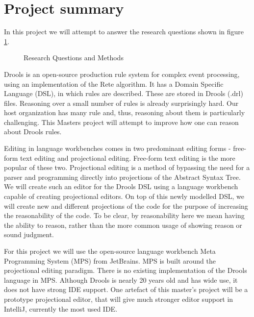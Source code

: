 \section{Project summary}

In this project we will attempt to answer the research questions shown in figure \ref{fig:Research_Questions}.
\begin{figure}[H]
    \centering
    \caption{Research Questions and Methods}
    \label{fig:Research_Questions}
\end{figure}


Drools\cite{browne2009jboss} is an open-source production rule system for complex event processing, using an implementation of the Rete algorithm\cite{forgy1989rete}.
It has a Domain Specific Language (DSL), in which rules are described.
These are stored in Drools (.drl) files. 
Reasoning over a small number of rules is already surprisingly hard.
Our host organization has many rule and, thus, reasoning about them is particularly challenging.
This Masters project will attempt to improve how one can reason about Drools rules.

Editing in language workbenches comes in two predominant editing forms - free-form text editing and projectional editing\cite{erdweg2013state}.
Free-form text editing is the more popular of these two.
Projectional editing is a method of bypassing the need for a parser and programming directly into projections of the Abstract Syntax Tree.
We will create such an editor for the Drools DSL using a language workbench capable of creating projectional editors.  
On top of this newly modelled DSL, we will create new and different projections of the code for the purpose of increasing the reasonability of the code. 
To be clear, by reasonability here we mean having the ability to reason, rather than the more common usage of showing reason or sound judgment.

For this project we will use the open-source language workbench Meta Programming System (MPS) from JetBrains\cite{MPS_ProductPage}.
MPS is built around the projectional editing paradigm.
There is no existing implementation of the Drools language in MPS.
Although Drools is nearly 20 years old and has wide use, it does not have strong IDE support.
One artefact of this master's project will be a prototype projectional editor, that will give much stronger editor support in IntelliJ, currently the most used IDE\cite{Java_usage_report}.
